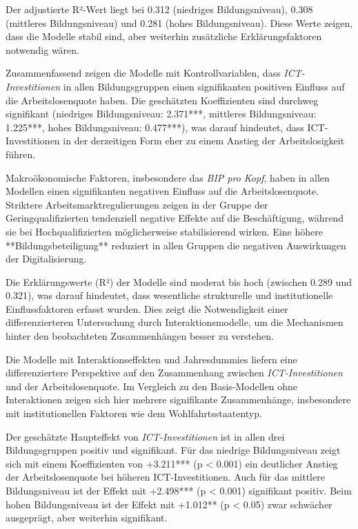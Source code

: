 Der adjustierte R²-Wert liegt bei 0.312 (niedriges Bildungsniveau), 0.308 (mittleres 
Bildungsniveau) und 0.281 (hohes Bildungsniveau). Diese Werte zeigen, dass die Modelle stabil sind, 
aber weiterhin zusätzliche Erklärungsfaktoren notwendig wären.

Zusammenfassend zeigen die Modelle mit Kontrollvariablen, dass \textit{\ac{ICT}-Investitionen} 
in allen Bildungsgruppen einen signifikanten positiven Einfluss auf die Arbeitslosenquote haben. 
Die geschätzten Koeffizienten sind durchweg signifikant (niedriges Bildungsniveau: 2.371***, 
mittleres Bildungsniveau: 1.225***, hohes Bildungsniveau: 0.477***), was darauf hindeutet, dass 
\ac{ICT}-Investitionen in der derzeitigen Form eher zu einem Anstieg der Arbeitslosigkeit führen.

Makroökonomische Faktoren, insbesondere das \textit{\ac{BIP} pro Kopf}, haben in allen Modellen 
einen signifikanten negativen Einfluss auf die Arbeitslosenquote. Striktere Arbeitsmarktregulierungen  
zeigen in der Gruppe der Geringqualifizierten tendenziell negative Effekte auf die Beschäftigung, 
während sie bei Hochqualifizierten möglicherweise stabilisierend wirken. Eine höhere 
**Bildungsbeteiligung** reduziert in allen Gruppen die negativen Auswirkungen der Digitalisierung.

Die Erklärungswerte (R²) der Modelle sind moderat bis hoch (zwischen 0.289 und 0.321), was darauf 
hindeutet, dass wesentliche strukturelle und institutionelle Einflussfaktoren erfasst wurden. Dies 
zeigt die Notwendigkeit einer differenzierteren Untersuchung durch Interaktionsmodelle, um die 
Mechanismen hinter den beobachteten Zusammenhängen besser zu verstehen.




Die Modelle mit Interaktionseffekten und Jahresdummies liefern eine differenziertere Perspektive 
auf den Zusammenhang zwischen \textit{\ac{ICT}-Investitionen} und der Arbeitslosenquote. Im 
Vergleich zu den Basis-Modellen ohne Interaktionen zeigen sich hier mehrere signifikante 
Zusammenhänge, insbesondere mit institutionellen Faktoren wie dem Wohlfahrtsstaatentyp.

Der geschätzte Haupteffekt von \textit{\ac{ICT}-Investitionen} ist in allen drei 
Bildungsgruppen positiv und signifikant. Für das niedrige Bildungsniveau zeigt sich mit einem 
Koeffizienten von +3.211*** (p < 0.001) ein deutlicher Anstieg der Arbeitslosenquote bei 
höheren ICT-Investitionen. Auch für das mittlere Bildungsniveau ist der Effekt mit 
+2.498*** (p < 0.001) signifikant positiv. Beim hohen Bildungsniveau ist der Effekt mit 
+1.012** (p < 0.05) zwar schwächer ausgeprägt, aber weiterhin signifikant.

